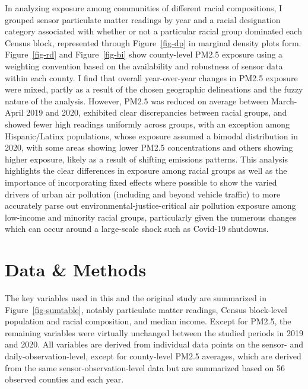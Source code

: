 \documentclass[12pt, ]{article}
\begin{document}
In analyzing exposure among communities of different racial
compositions, I grouped sensor particulate matter readings by year and a
racial designation category associated with whether or not a particular
racial group dominated each Census block, represented through
Figure~\ref{fig-dp} in marginal density plots form. Figure~\ref{fig-rd}
and Figure~\ref{fig-bi} show county-level PM2.5 exposure using a
weighting convention based on the availability and robustness of sensor
data within each county. I find that overall year-over-year changes in
PM2.5 exposure were mixed, partly as a result of the chosen geographic
delineations and the fuzzy nature of the analysis. However, PM2.5 was
reduced on average between March-April 2019 and 2020, exhibited clear
discrepancies between racial groups, and showed fewer high readings
uniformly across groups, with an exception among Hispanic/Latinx
populations, whose exposure assumed a bimodal distribution in 2020, with
some areas showing lower PM2.5 concentrations and others showing higher
exposure, likely as a result of shifting emissions patterns. This
analysis highlights the clear differences in exposure among racial
groups as well as the importance of incorporating fixed effects where
possible to show the varied drivers of urban air pollution (including
and beyond vehicle traffic) to more accurately parse out
environmental-justice-critical air pollution exposure among low-income
and minority racial groups, particularly given the numerous changes
which can occur around a large-scale shock such as Covid-19 shutdowns.

\hypertarget{data-methods}{%
\section{Data \& Methods}\label{data-methods}}

The key variables used in this and the original study are summarized in
Figure~\ref{fig-sumtable}, notably particulate matter readings, Census
block-level population and racial composition, and median income. Except
for PM2.5, the remaining variables were virtually unchanged between the
studied periods in 2019 and 2020. All variables are derived from
individual data points on the sensor- and daily-observation-level,
except for county-level PM2.5 averages, which are derived from the same
sensor-observation-level data but are summarized based on 56 observed
counties and each year.
\end{document}
